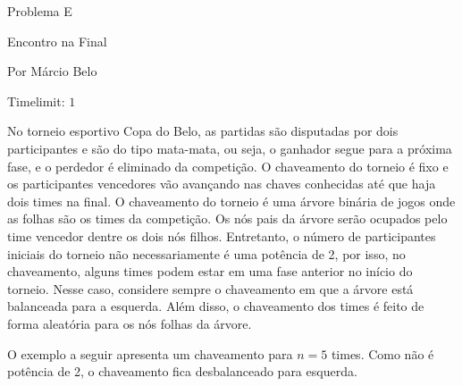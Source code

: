 \begin{center}
Problema E

Encontro na Final

{\tiny Por Márcio Belo}

Timelimit: $1$	
\end{center}			

No torneio esportivo Copa do Belo, as partidas são disputadas por dois participantes e são do tipo mata-mata, ou seja, o ganhador segue para a próxima fase, e o perdedor é eliminado da competição. 
O chaveamento do torneio é fixo e os participantes vencedores vão avançando nas chaves conhecidas até que haja dois times na final. 
O chaveamento do torneio é uma árvore binária de jogos onde as folhas são os times da competição. 
Os nós pais da árvore serão ocupados pelo time vencedor dentre os dois nós filhos. 
Entretanto, o número de participantes iniciais do torneio não necessariamente é uma potência de 2, por isso, no chaveamento, alguns times podem estar em uma fase anterior no início do torneio. 
Nesse caso, considere sempre o chaveamento em que a árvore está balanceada para a esquerda. 
Além disso, o chaveamento dos times é feito de forma aleatória para os nós folhas da árvore. 

O exemplo a seguir apresenta um chaveamento para $n=5$ times. Como não é potência de 2, o chaveamento fica desbalanceado para esquerda. 

\begin{center}  \end{center}


